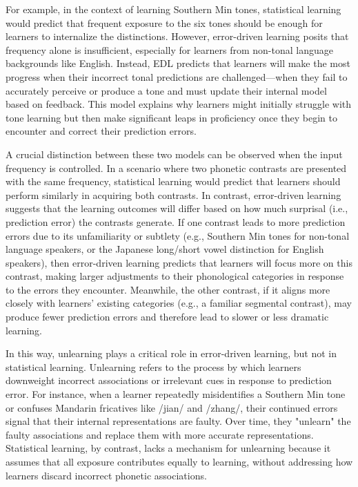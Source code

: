 For example, in the context of learning Southern Min tones, statistical learning would predict that frequent exposure to the six tones should be enough for learners to internalize the distinctions. However, error-driven learning posits that frequency alone is insufficient, especially for learners from non-tonal language backgrounds like English. Instead, EDL predicts that learners will make the most progress when their incorrect tonal predictions are challenged—when they fail to accurately perceive or produce a tone and must update their internal model based on feedback. This model explains why learners might initially struggle with tone learning but then make significant leaps in proficiency once they begin to encounter and correct their prediction errors.

A crucial distinction between these two models can be observed when the input frequency is controlled. In a scenario where two phonetic contrasts are presented with the same frequency, statistical learning would predict that learners should perform similarly in acquiring both contrasts. In contrast, error-driven learning suggests that the learning outcomes will differ based on how much surprisal (i.e., prediction error) the contrasts generate. If one contrast leads to more prediction errors due to its unfamiliarity or subtlety (e.g., Southern Min tones for non-tonal language speakers, or the Japanese long/short vowel distinction for English speakers), then error-driven learning predicts that learners will focus more on this contrast, making larger adjustments to their phonological categories in response to the errors they encounter. Meanwhile, the other contrast, if it aligns more closely with learners’ existing categories (e.g., a familiar segmental contrast), may produce fewer prediction errors and therefore lead to slower or less dramatic learning.

In this way, unlearning plays a critical role in error-driven learning, but not in statistical learning. Unlearning refers to the process by which learners downweight incorrect associations or irrelevant cues in response to prediction error. For instance, when a learner repeatedly misidentifies a Southern Min tone or confuses Mandarin fricatives like /jian/ and /zhang/, their continued errors signal that their internal representations are faulty. Over time, they "unlearn" the faulty associations and replace them with more accurate representations. Statistical learning, by contrast, lacks a mechanism for unlearning because it assumes that all exposure contributes equally to learning, without addressing how learners discard incorrect phonetic associations.


